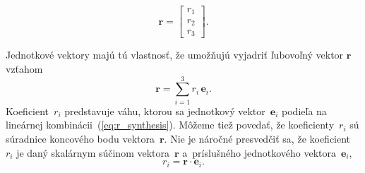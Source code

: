 \documentclass[a4paper, 12pt]{book}
\let\vec\mathbf
\begin{document}
\begin{equation}
\vec r =
\begin{bmatrix}
r_1\\
r_2\\
r_3
\end{bmatrix}
{.}
\end{equation}

Jednotkové vektory majú tú vlastnosť, že umožňujú vyjadriť ľubovoľný vektor
$\vec r$ vzťahom
%
\begin{equation}
\label{eq:r_synthesis}
\vec r = \sum_{i = 1}^3 r_i \, \vec e_i{.}
\end{equation}
%
Koeficient~$r_i$ predstavuje váhu, ktorou sa jednotkový vektor~$\vec e_i$ 
podieľa na lineárnej kombinácii~(\ref{eq:r_synthesis}).  Môžeme tiež povedať, 
že koeficienty~$r_i$ sú súradnice koncového bodu vektora~$\vec r$.  Nie je 
náročné presvedčiť sa, že koeficient~$r_i$ je daný skalárnym súčinom 
vektora~$\vec r$ a~príslušného jednotkového vektora~$\vec e_i$,
%
\begin{equation}
\label{eq:r_analysis}
r_i = \vec r \cdot \vec e_i{.}
\end{equation}
\end{document}
